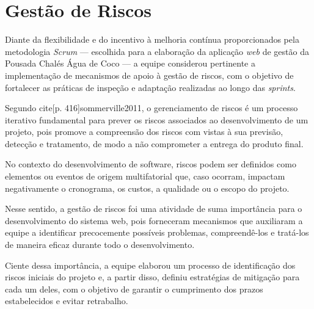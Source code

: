 \documentclass[
	12pt,				%
	openany,			%
	twoside,			%
	a4paper,			%
	english,			%
	french,				%
	spanish,			%
	brazil				%
	]{abntex2}
\begin{document}
\section{Gestão de Riscos}
Diante da flexibilidade e do incentivo à melhoria contínua proporcionados pela metodologia \textit{Scrum} — escolhida para a elaboração da aplicação \textit{web} de gestão da Pousada Chalés Água de Coco — a equipe considerou pertinente a implementação de mecanismos de apoio à gestão de riscos, com o objetivo de fortalecer as práticas de inspeção e adaptação realizadas ao longo das \textit{sprints}.

Segundo cite[p. 416]{sommerville2011}, o gerenciamento de riscos é um processo iterativo fundamental para prever os riscos associados ao desenvolvimento de um projeto, pois promove a compreensão dos riscos com vistas à sua previsão, detecção e tratamento, de modo a não comprometer a entrega do produto final.

No contexto do desenvolvimento de software, riscos podem ser definidos como elementos ou eventos de origem multifatorial que, caso ocorram, impactam negativamente  o cronograma, os custos, a qualidade ou o escopo do projeto.

Nesse sentido, a gestão de riscos foi uma atividade de suma importância para o desenvolvimento do sistema web, pois forneceram mecanismos que auxiliaram a equipe a identificar precocemente possíveis problemas, compreendê-los e tratá-los de maneira eficaz durante todo o desenvolvimento. 

Ciente dessa importância, a equipe elaborou um processo de identificação dos riscos iniciais do projeto e, a partir disso, definiu estratégias de mitigação para cada um deles, com o objetivo de garantir o cumprimento dos prazos estabelecidos e evitar retrabalho.
\end{document}
